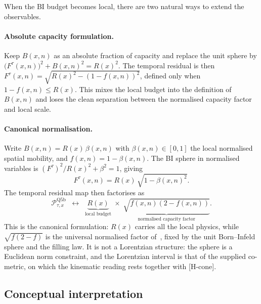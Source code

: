 \documentclass[11pt,a4paper]{article}
\begin{document}
      When the BI budget becomes local, there are two natural ways to extend the observables.

      \paragraph{Absolute capacity formulation.}
        Keep $B(x,n)$ as an absolute fraction of capacity and replace the unit sphere by
        $\bigl(F^\tau(x,n)\bigr)^2 + B(x,n)^2 = R(x)^2$.
        The temporal residual is then $F^\tau(x,n) = \sqrt{R(x)^2-(1-f(x,n))^2}$,
        defined only when $1-f(x,n) \leq R(x)$.
        This mixes the local budget into the definition of $B(x,n)$ and loses the clean
        separation between the normalised capacity factor and local scale.

      \paragraph{Canonical normalisation.}
        Write $B(x,n) = R(x)\,\beta(x,n)$ with $\beta(x,n) \in [0,1]$ the local normalised
        spatial mobility, and $f(x,n) = 1-\beta(x,n)$.
        The BI sphere in normalised variables is $(F^\tau)^2/R(x)^2 + \beta^2 = 1$, giving
      \begin{equation}\label{eq:Ftau-local}
        F^\tau(x,n) = R(x)\,\sqrt{1-\beta(x,n)^2}.
        \end{equation}
        The temporal residual map then factorises as
      \begin{equation}\label{eq:factorisation}
        \mathcal{P}_{\tau,x}^{\mathrm{Q5b}} \;\;\longleftrightarrow\;\;
        \underbrace{R(x)}_{\text{local budget}}
        \;\times\;
        \underbrace{\sqrt{f(x,n)(2-f(x,n))}}_{\text{normalised capacity factor}}.
        \end{equation}
        This is the canonical formulation: $R(x)$ carries all the local physics, while
        $\sqrt{f(2-f)}$ is the universal normalised factor of~\cite{Beau2026tp}, fixed by the unit Born--Infeld
        sphere and the filling law.
        It is not a Lorentzian structure: the sphere is a Euclidean norm constraint, and the Lorentzian interval
        is that of the supplied co-metric, on which the kinematic reading rests together with [H-cone].

  \subsection{Conceptual interpretation}\label{sec:interp}
\end{document}
